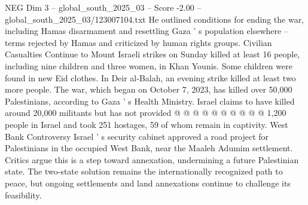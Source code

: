 \begin{textsample}{NEG Dim 3 – global\_south\_2025\_03 – Score -2.00 – global\_south\_2025\_03/123007104.txt}
He outlined conditions for ending the war, including Hamas disarmament and resettling Gaza ' s population elsewhere -- terms rejected by Hamas and criticized by human rights groups.
Civilian Casualties Continue to Mount Israeli strikes on Sunday killed at least 16 people, including nine children and three women, in Khan Younis.
Some children were found in new Eid clothes.
In Deir al-Balah, an evening strike killed at least two more people.
The war, which began on October 7, 2023, has killed over 50,000 Palestinians, according to Gaza ' s Health Ministry.
Israel claims to have killed around 20,000 militants but has not provided @ @ @ @ @ @ @ @ @ @ 1,200 people in Israel and took 251 hostages, 59 of whom remain in captivity.
West Bank Controversy Israel ' s security cabinet approved a road project for Palestinians in the occupied West Bank, near the Maaleh Adumim settlement.
Critics argue this is a step toward annexation, undermining a future Palestinian state.
The two-state solution remains the internationally recognized path to peace, but ongoing settlements and land annexations continue to challenge its feasibility.

\end{textsample}
